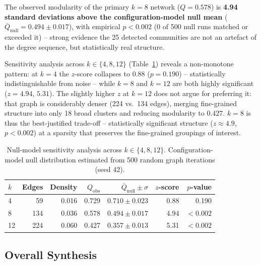\documentclass[11pt]{article}
\begin{document}
The observed modularity of the primary $k{=}8$ network ($Q=0.578$) is \textbf{4.94
standard deviations above the configuration-model null mean}
($\bar{Q}_{\text{null}} = 0.494 \pm 0.017$), with empirical $p<0.002$ (0 of 500 null
runs matched or exceeded it) -- strong evidence the 25 detected communities are not an
artefact of the degree sequence, but statistically real structure.

Sensitivity analysis across $k \in \{4,8,12\}$ (Table~\ref{tab:k_sensitivity}) reveals a
non-monotone pattern: at $k{=}4$ the $z$-score collapses to $0.88$ ($p=0.190$) --
statistically indistinguishable from noise -- while $k{=}8$ and $k{=}12$ are both
highly significant ($z=4.94$, $5.31$). The slightly higher $z$ at $k{=}12$ does not
argue for preferring it: that graph is considerably denser (224 vs.\ 134 edges),
merging fine-grained structure into only 18 broad clusters and reducing modularity to
$0.427$. $k{=}8$ is thus the best-justified trade-off -- statistically significant
structure ($z\approx4.9$, $p<0.002$) at a sparsity that preserves the fine-grained
groupings of interest.

\begin{table}[htbp]
\centering
\begin{tabular}{lrrrrrr}
\toprule
$k$ & Edges & Density & $Q_{\text{obs}}$ & $\bar{Q}_{\text{null}} \pm \sigma$ & $z$-score & $p$-value \\
\midrule
4  & 59  & 0.016 & 0.729 & $0.710 \pm 0.023$ & 0.88 & 0.190 \\
8  & 134 & 0.036 & 0.578 & $0.494 \pm 0.017$ & 4.94 & $<0.002$ \\
12 & 224 & 0.060 & 0.427 & $0.357 \pm 0.013$ & 5.31 & $<0.002$ \\
\bottomrule
\end{tabular}
\caption{Null-model sensitivity analysis across $k \in \{4, 8, 12\}$. Configuration-model
null distribution estimated from 500 random graph iterations (seed 42).}
\label{tab:k_sensitivity}
\end{table}

\subsection{Overall Synthesis}
\end{document}
